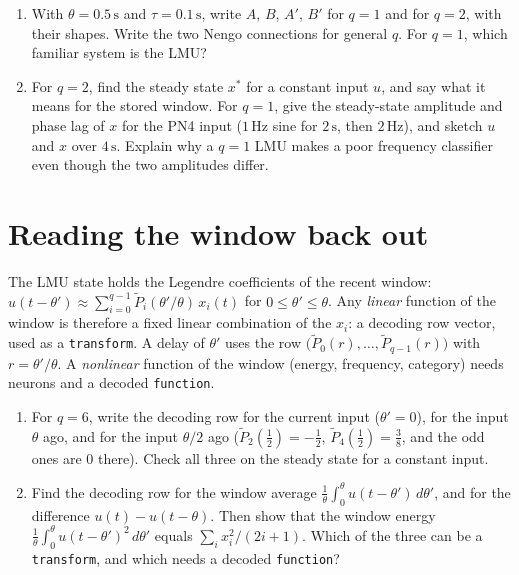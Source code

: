 \documentclass[11pt,letterpaper]{article}
\begin{document}
\begin{enumerate}
\item With $\theta = 0.5\,\mathrm{s}$ and $\tau = 0.1\,\mathrm{s}$, write $A$, $B$, $A'$, $B'$ for $q = 1$ and for $q = 2$, with their shapes. Write the two Nengo connections for general $q$. For $q = 1$, which familiar system is the LMU?
\item For $q = 2$, find the steady state $x^*$ for a constant input $u$, and say what it means for the stored window. For $q = 1$, give the steady-state amplitude and phase lag of $x$ for the PN4 input ($1\,\mathrm{Hz}$ sine for $2\,\mathrm{s}$, then $2\,\mathrm{Hz}$), and sketch $u$ and $x$ over $4\,\mathrm{s}$. Explain why a $q = 1$ LMU makes a poor frequency classifier even though the two amplitudes differ.
\end{enumerate}

\section{Reading the window back out}

\begin{idea}
The LMU state holds the Legendre coefficients of the recent window: $u(t - \theta') \approx \sum_{i=0}^{q-1} \tilde P_i(\theta'/\theta)\,x_i(t)$ for $0 \le \theta' \le \theta$. Any \emph{linear} function of the window is therefore a fixed linear combination of the $x_i$: a decoding row vector, used as a \texttt{transform}. A delay of $\theta'$ uses the row $\bigl(\tilde P_0(r), \dots, \tilde P_{q-1}(r)\bigr)$ with $r = \theta'/\theta$. A \emph{nonlinear} function of the window (energy, frequency, category) needs neurons and a decoded \texttt{function}.
\end{idea}

\begin{enumerate}
\item For $q = 6$, write the decoding row for the current input ($\theta' = 0$), for the input $\theta$ ago, and for the input $\theta/2$ ago ($\tilde P_2(\frac12) = -\frac12$, $\tilde P_4(\frac12) = \frac38$, and the odd ones are $0$ there). Check all three on the steady state for a constant input.
\item Find the decoding row for the window average $\frac1\theta\int_0^\theta u(t - \theta')\,d\theta'$, and for the difference $u(t) - u(t - \theta)$. Then show that the window energy $\frac1\theta\int_0^\theta u(t - \theta')^2\,d\theta'$ equals $\sum_i x_i^2/(2i + 1)$. Which of the three can be a \texttt{transform}, and which needs a decoded \texttt{function}?
\end{enumerate}
\end{document}
